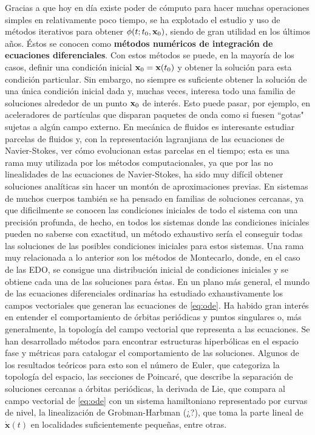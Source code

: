 Gracias a que hoy en día existe poder de cómputo para hacer muchas operaciones simples en relativamente poco tiempo, se ha explotado el estudio y uso de métodos iterativos para obtener $\phi(t;t_0,\mathbf{x}_0)$, siendo de gran utilidad en los últimos años. Éstos se conocen como \textbf{métodos numéricos de integración de ecuaciones diferenciales}. Con estos métodos se puede, en la mayoría de los casos, definir una condición inicial $\mathbf{x}_0 = \mathbf{x}(t_0)$ y obtener la solución para esta condición particular. Sin embargo, no siempre es suficiente obtener la solución de una única condición inicial dada y, muchas veces, interesa todo una familia de soluciones alrededor de un punto $\mathbf{x}_0$ de interés. Esto puede pasar, por ejemplo, en aceleradores de partículas que disparan paquetes de onda como si fuesen ``gotas" sujetas a algún campo externo. En mecánica de fluidos es interesante estudiar parcelas de fluidos y, con la representación lagranjiana de las ecuaciones de Navier-Stokes, ver cómo evolucionan estas parcelas en el tiempo; esta es una rama muy utilizada por los métodos computacionales, ya que por las no linealidades de las ecuaciones de Navier-Stokes, ha sido muy difícil obtener soluciones analíticas sin hacer un montón de aproximaciones previas. En sistemas de muchos cuerpos también se ha pensado en familias de soluciones cercanas, ya que dificilmente se conocen las condiciones iniciales de todo el sistema con una precisión profunda, de hecho, en todos los sistemas donde las condiciones iniciales pueden no saberse con exactitud, un método exhaustivo sería el conseguir todas las soluciones de las posibles condiciones iniciales para estos sistemas. Una rama muy relacionada a lo anterior son los métodos de Montecarlo, donde, en el caso de las EDO, se consigue una distribución inicial de condiciones iniciales y se obtiene cada una de las soluciones para éstas. 
En un plano más general, el mundo de las ecuaciones diferenciales ordinarias ha estudiado exhaustivamente los campos vectoriales que generan las ecuaciones de \ref{eq:ode}. Ha habido gran interés en entender el comportamiento de órbitas periódicas y puntos singulares o, más generalmente, la topología del campo vectorial que representa a las ecuaciones. Se han desarrollado métodos para encontrar estructuras hiperbólicas en el espacio fase y métricas para catalogar el comportamiento de las soluciones. Algunos de los resultados teóricos para esto son el número de Euler, que categoriza la topología del espacio, las secciones de Poincaré, que describe la separación de soluciones cercanas a órbitas periódicas, la derivada de Lie, que compara al campo vectorial de \ref{eq:ode} con un sistema hamiltoniano representado por curvas de nivel, la linealización de Grobman-Harbman (¿?), que toma la parte lineal de $\dot{\mathbf{x}}(t)$ en localidades suficientemente pequeñas, entre otras. 


